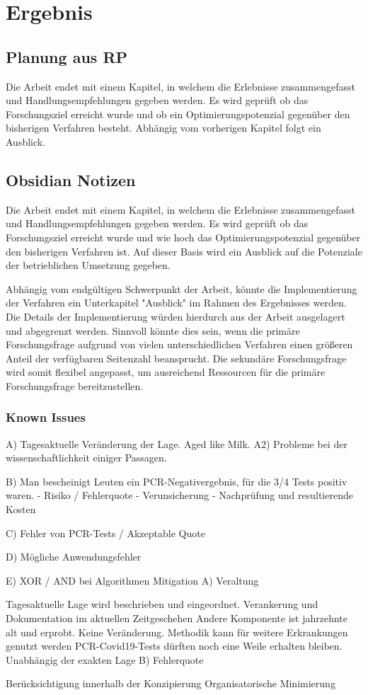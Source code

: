 \chapter{Ergebnis}

\section{Planung aus RP}
Die Arbeit endet mit einem Kapitel, in welchem die Erlebnisse zusammengefasst und Handlungsempfehlungen gegeben werden.
Es wird geprüft ob das Forschungsziel erreicht wurde und ob ein Optimierungspotenzial gegenüber den bisherigen Verfahren besteht.
Abhängig vom vorherigen Kapitel folgt ein Ausblick.

\section{Obsidian Notizen}
Die Arbeit endet mit einem Kapitel, in welchem die Erlebnisse zusammengefasst und Handlungsempfehlungen gegeben werden.
Es wird geprüft ob das Forschungsziel erreicht wurde und wie hoch das Optimierungspotenzial gegenüber den bisherigen Verfahren ist.
Auf dieser Basis wird ein Ausblick auf die Potenziale der betrieblichen Umsetzung gegeben.

Abhängig vom endgültigen Schwerpunkt der Arbeit, könnte die Implementierung der Verfahren ein Unterkapitel "Ausblick" im Rahmen des Ergebnisses werden.
Die Details der Implementierung würden hierdurch aus der Arbeit ausgelagert und abgegrenzt werden.
Sinnvoll könnte dies sein, wenn die primäre Forschungsfrage aufgrund von vielen unterschiedlichen Verfahren einen größeren Anteil der verfügbaren Seitenzahl beansprucht.
Die sekundäre Forschungsfrage wird somit flexibel angepasst, um ausreichend Ressourcen für die primäre Forschungsfrage bereitzustellen.

\subsection{Known Issues}
A) Tagesaktuelle Veränderung der Lage. Aged like Milk.
A2) Probleme bei der wissenschaftlichkeit einiger Passagen.

B) Man bescheinigt Leuten ein PCR-Negativergebnis, für die 3/4 Tests positiv waren.
- Risiko / Fehlerquote
- Verunsicherung
- Nachprüfung und resultierende Kosten

C) Fehler von PCR-Tests / Akzeptable Quote

D) Mögliche Anwendungsfehler

E) XOR / AND bei Algorithmen
Mitigation
A) Veraltung

Tagesaktuelle Lage wird beschrieben und eingeordnet.
Verankerung und Dokumentation im aktuellen Zeitgeschehen
Andere Komponente ist jahrzehnte alt und erprobt. Keine Veränderung.
Methodik kann für weitere Erkrankungen genutzt werden
PCR-Covid19-Tests dürften noch eine Weile erhalten bleiben. Unabhängig der exakten Lage
B) Fehlerquote

Berücksichtigung innerhalb der Konzipierung
Organisatorische Minimierung
\fi

